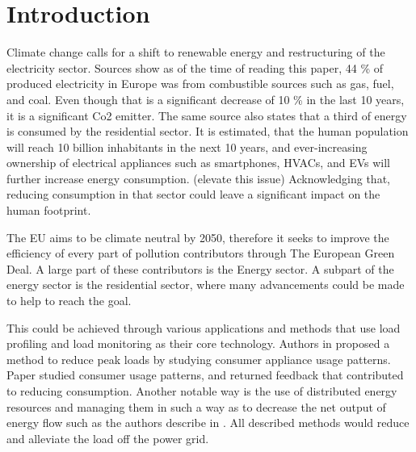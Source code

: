 \documentclass[
11pt, %
english, %
singlespacing, %
headsepline, %
]{MastersDoctoralThesis} %
\begin{document}
\mainmatter %

\pagestyle{thesis} %


% 

\chapter{Introduction}

Climate change calls for a shift to renewable energy and restructuring of the electricity sector.
Sources \cite{eurostat2020} show as of the time of reading this paper, 44 \% of produced electricity in Europe was from combustible sources such as gas, fuel, and coal. Even 
though that is a significant decrease of 10 \% in the last 10 years, it is a significant Co2 emitter.
The same source \cite{eurostat2020} also states that a third of energy is consumed by the residential sector. It is estimated, 
that the human population will reach 10 billion inhabitants in the next 10 years, and ever-increasing ownership of electrical appliances such as smartphones, HVACs, and EVs will further increase energy consumption. (elevate this issue)
Acknowledging that, reducing consumption in that sector could leave a significant impact on the human footprint. 


The EU aims to be climate neutral by 2050, therefore it seeks to improve the efficiency of every part of pollution contributors through The European Green Deal.
A large part of these contributors is the Energy sector.
A subpart of the energy sector is the residential sector, where many advancements could be made to help to reach the goal.  

This could be achieved through various applications and methods that use load profiling and load monitoring as their core technology.
Authors in \cite{Chuan2014} proposed a method to reduce peak loads by studying consumer
appliance usage patterns. Paper \cite{Csoknyai2019} studied consumer usage patterns, and returned feedback that contributed to reducing consumption.
Another notable way is the use of distributed energy resources and managing them in such a way as to decrease the net output of energy flow such as the authors describe in
\cite{MORENOJARAMILLO2021445}. All described methods would reduce and alleviate the load off the power grid.
\end{document}
